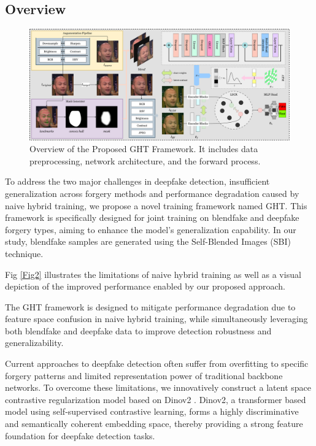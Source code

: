 \documentclass[final,5p,times]{elsarticle}
\begin{document}
\subsection{Overview}

\begin{figure}[htb]
\centering
\includegraphics[width=1.0\linewidth]{images/Fig3.pdf}
\caption{Overview of the Proposed GHT Framework. It includes data preprocessing, network architecture, and the forward process.} 
\label{Fig3}
\end{figure}

To address the two major challenges in deepfake detection, insufficient generalization across forgery methods and performance degradation caused by naive hybrid training, we propose a novel training framework named GHT. This framework is specifically designed for joint training on blendfake and deepfake forgery types, aiming to enhance the model's generalization capability. In our study, blendfake samples are generated using the Self-Blended Images (SBI) technique.

Fig \ref{Fig2} illustrates the limitations of naive hybrid training as well as a visual depiction of the improved performance enabled by our proposed approach.

The GHT framework is designed to mitigate performance degradation due to feature space confusion in naive hybrid training, while simultaneously leveraging both blendfake and deepfake data to improve detection robustness and generalizability.

Current approaches to deepfake detection often suffer from overfitting to specific forgery patterns and limited representation power of traditional backbone networks. To overcome these limitations, we innovatively construct a latent space contrastive regularization model based on Dinov2 \cite{2}. Dinov2, a transformer based model using self-supervised contrastive learning, forms a highly discriminative and semantically coherent embedding space, thereby providing a strong feature foundation for deepfake detection tasks.
\end{document}
